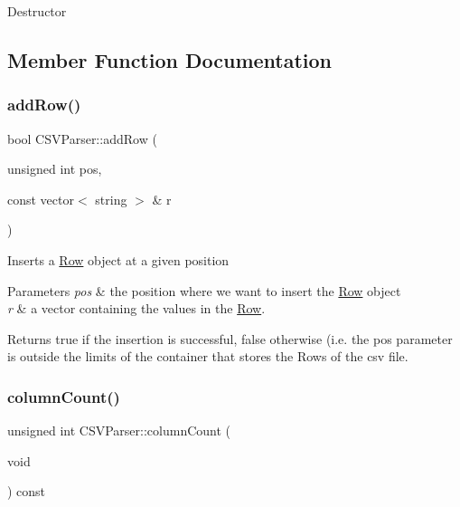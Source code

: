 Destructor 

\subsection{Member Function Documentation}
\mbox{\label{class_c_s_v_parser_a7e742c5123efa0a49d576776f8832ddb}} 
\subsubsection{\texorpdfstring{addRow()}{addRow()}}
{\footnotesize\ttfamily bool C\+S\+V\+Parser\+::add\+Row (\begin{DoxyParamCaption}\item[{unsigned int}]{pos,  }\item[{const vector$<$ string $>$ \&}]{r }\end{DoxyParamCaption})}

Inserts a \mbox{\hyperlink{class_row}{Row}} object at a given position 
\begin{DoxyParams}{Parameters}
{\em pos} & the position where we want to insert the \mbox{\hyperlink{class_row}{Row}} object \\
\hline
{\em r} & a vector containing the values in the \mbox{\hyperlink{class_row}{Row}}. \\
\hline
\end{DoxyParams}
\begin{DoxyReturn}{Returns}
true if the insertion is successful, false otherwise (i.\+e. the pos parameter is outside the limits of the container that stores the Rows of the csv file. 
\end{DoxyReturn}
\mbox{\label{class_c_s_v_parser_a1e30268d574a0c1911de002a893d7a7e}} 
\subsubsection{\texorpdfstring{columnCount()}{columnCount()}}
{\footnotesize\ttfamily unsigned int C\+S\+V\+Parser\+::column\+Count (\begin{DoxyParamCaption}\item[{void}]{ }\end{DoxyParamCaption}) const}

